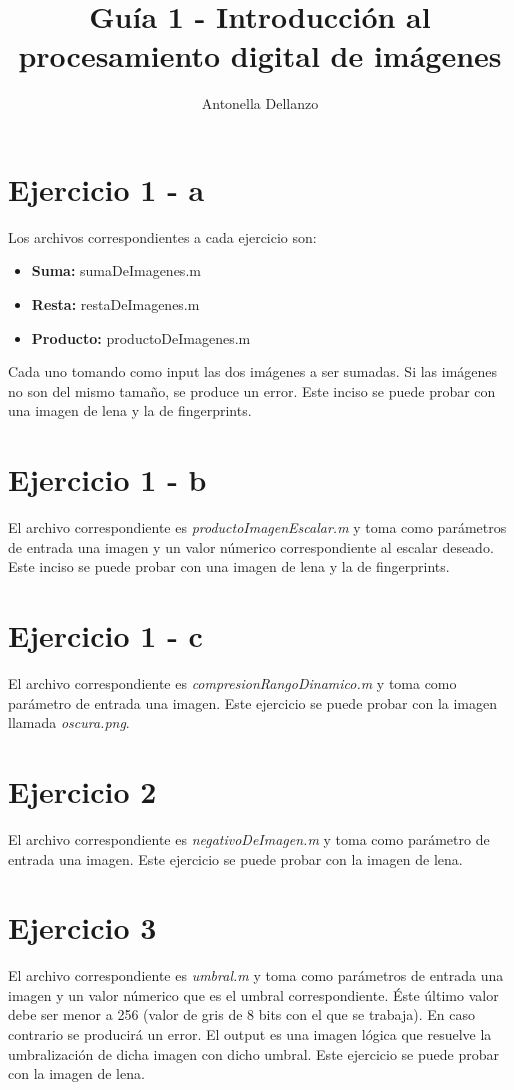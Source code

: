 \documentclass{article}
\begin{document}
\author{Antonella Dellanzo}
\title{Guía 1 - Introducción al procesamiento digital de imágenes}
\date{}
\maketitle

\section*{Ejercicio 1 - a}
Los archivos correspondientes a cada ejercicio son:
\begin{itemize}
\item \textbf{Suma: } sumaDeImagenes.m
\item \textbf{Resta: } restaDeImagenes.m
\item \textbf{Producto: } productoDeImagenes.m
\end{itemize}
Cada uno tomando como input las dos imágenes a ser sumadas. Si las imágenes no son del mismo tamaño, se produce un error. Este inciso se puede probar con una imagen de lena y la de fingerprints.

\section*{Ejercicio 1 - b}
El archivo correspondiente es \textit{productoImagenEscalar.m} y toma como parámetros de entrada una imagen y un valor númerico correspondiente al escalar deseado. Este inciso se puede probar con una imagen de lena y la de fingerprints.

\section*{Ejercicio 1 - c}
El archivo correspondiente es \textit{compresionRangoDinamico.m} y toma como parámetro de entrada una imagen. Este ejercicio se puede probar con la imagen llamada \textit{oscura.png}.

\section*{Ejercicio 2}
El archivo correspondiente es \textit{negativoDeImagen.m} y toma como parámetro de entrada una imagen. Este ejercicio se puede probar con la imagen de lena.

\section*{Ejercicio 3}
El archivo correspondiente es \textit{umbral.m} y toma como parámetros de entrada una imagen y un valor númerico que es el umbral correspondiente. Éste último valor debe ser menor a 256 (valor de gris de 8 bits con el que se trabaja). En caso contrario se producirá un error. El output es una imagen lógica que resuelve la umbralización de dicha imagen con dicho umbral. Este ejercicio se puede probar con la imagen de lena.
\end{document}

